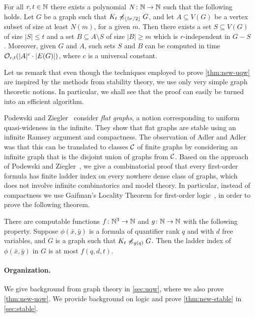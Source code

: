 \begin{theorem}\label{thm:new-uqw}
For all $r,t\in \mathbb{N}$ there exists a polynomial  $N\colon \mathbb{N}\to \mathbb{N}$ such that the following holds.
Let $G$ be a graph such that $K_t\not\preccurlyeq_{\lfloor 5r/2\rfloor} G$, and
let $A\subseteq V(G)$ be a vertex subset of size at least $N(m)$, for a given $m$.
Then there exists a set $S\subseteq V(G)$ of size $|S|\leq t$ and a set $B\subseteq A\setminus S$ 
of size $|B|\geq m$ which is $r$-independent in $G-S$.
Moreover, given $G$ and $A$, such sets $S$ and $B$ can be computed in time $\mathcal{O}_{r,t}(|A|^c\cdot |E(G)|)$, where $c$ is a universal constant.
\end{theorem}

Let us remark
that even though the techniques employed to prove \cref{thm:new-uqw} are inspired by the methods from stability theory, 
we use only very simple graph theoretic notions. In particular, we shall see that the
proof can easily be turned into an efficient algorithm.

 Podewski and Ziegler~\cite{podewski1978stable} 
consider \emph{flat graphs}, a notion corresponding to uniform quasi-wideness in the 
infinite. They show that  flat graphs are stable using an 
infinite Ramsey argument and compactness. The observation of Adler and Adler~\cite{adler2014interpreting} was that
this can be translated to classes $\mathcal{C}$ of finite graphs by considering an infinite graph that is the disjoint union of graphs from $\mathcal{C}$.
Based on the approach of Podewski and Ziegler~\cite{podewski1978stable}, we give a combinatorial 
proof that every first-order formula has finite ladder index on every
nowhere dense class of graphs, which does not involve infinite combinatorics and model theory.
In particular, instead of compactness we use Gaifman's Locality Theorem for
first-order logic~\cite{gaifman1982local}, in order to prove the following theorem.

\begin{theorem}\label{thm:new-stable}
  There are computable functions $f\colon \mathbb{N}^3\to\mathbb{N}$ and $g\colon\mathbb{N}\to\mathbb{N}$ with the following property.
Suppose $\phi(\bar x,\bar y)$ is a formula of quantifier rank $q$ and with $d$ free variables,
and $G$ is a graph such that $K_t\not\preccurlyeq_{g(q)} G$. Then the ladder index of $\phi(\bar x,\bar y)$ in $G$ is at most $f(q,d,t)$.
\end{theorem}

%

\paragraph{Organization.} We give background from graph theory in \cref{sec:uqw}, where we also
prove \cref{thm:new-uqw}. 
We provide background 
on logic and prove \cref{thm:new-stable} in \cref{sec:stable}. 



